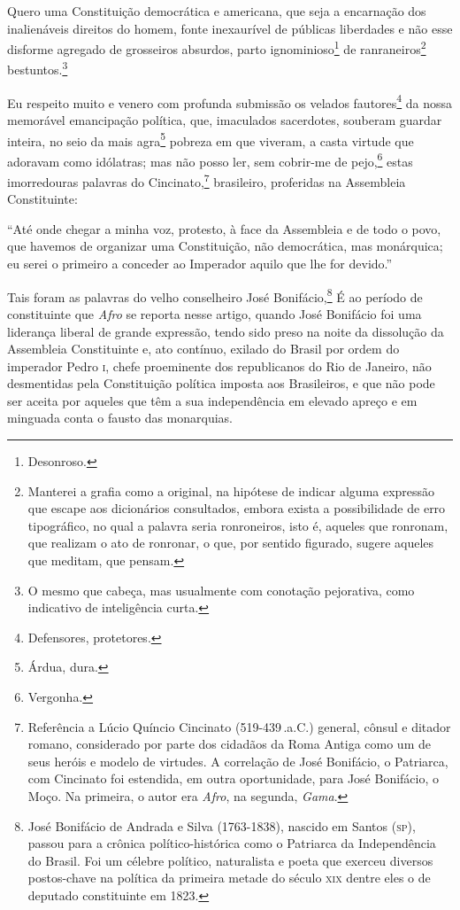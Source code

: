 Quero uma Constituição democrática e americana, que seja a encarnação
dos inalienáveis direitos do homem, fonte inexaurível de públicas
liberdades e não esse disforme agregado de grosseiros absurdos, parto
ignominioso\footnote{Desonroso.} de ranraneiros\footnote{Manterei a
  grafia como a original, na hipótese de indicar alguma expressão que
  escape aos dicionários consultados, embora exista a possibilidade de
  erro tipográfico, no qual a palavra seria ronroneiros, isto é, aqueles
  que ronronam, que realizam o ato de ronronar, o que, por sentido
  figurado, sugere aqueles que meditam, que pensam.}
bestuntos.\footnote{O mesmo que cabeça, mas usualmente com conotação
  pejorativa, como indicativo de inteligência curta.}

Eu respeito muito e venero com profunda submissão os velados
fautores\footnote{Defensores, protetores.} da nossa memorável
emancipação política, que, imaculados sacerdotes, souberam guardar
inteira, no seio da mais agra\footnote{Árdua, dura.} pobreza em que
viveram, a casta virtude que adoravam como idólatras; mas não posso ler,
sem cobrir-me de pejo,\footnote{Vergonha.} estas imorredouras palavras
do Cincinato,\footnote{Referência a Lúcio Quíncio Cincinato (519-439\,.a.C.) general, cônsul e ditador romano, considerado por parte
  dos cidadãos da Roma Antiga como um de seus heróis e modelo de
  virtudes. A correlação de José Bonifácio, o Patriarca, com Cincinato
  foi estendida, em outra oportunidade, para José Bonifácio, o Moço. Na
  primeira, o autor era \emph{Afro}, na segunda, \emph{Gama}.}
brasileiro, proferidas na Assembleia Constituinte:

``Até onde chegar a minha voz, protesto, à face da Assembleia e de todo o
povo, que havemos de organizar uma Constituição, não democrática, mas
monárquica; eu serei o primeiro a conceder ao Imperador aquilo que lhe
for devido.''

Tais foram as palavras do velho conselheiro José Bonifácio,\footnote{
  José Bonifácio de Andrada e Silva (1763-1838), nascido em Santos (\textsc{sp}),
  passou para a crônica político-histórica como o Patriarca da
  Independência do Brasil. Foi um célebre político, naturalista e poeta
  que exerceu diversos postos-chave na política da primeira metade do
  século \textsc{xix} dentre eles o de deputado constituinte em 1823.\label{bonifacio}} 
  É ao período de constituinte que \emph{Afro} se reporta nesse artigo,
  quando José Bonifácio foi uma liderança liberal de grande expressão,
  tendo sido preso na noite da dissolução da Assembleia Constituinte e,
  ato contínuo, exilado do Brasil por ordem do imperador Pedro \textsc{i},
chefe proeminente dos republicanos do Rio de Janeiro, não desmentidas
pela Constituição política imposta aos Brasileiros, e que não pode ser
aceita por aqueles que têm a sua independência em elevado apreço e em
minguada conta o fausto das monarquias.

